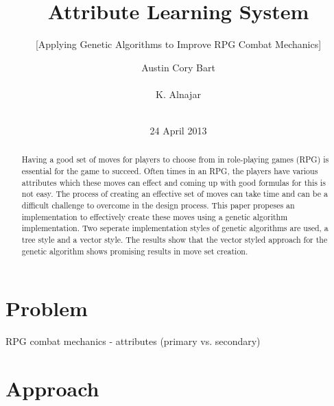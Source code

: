 \documentclass{acm_proc_article-sp}
\begin{document}
\title{Attribute Learning System}
\subtitle{[Applying Genetic Algorithms to Improve RPG Combat Mechanics]} %



\author{
\alignauthor
Austin Cory Bart\\
       \\
\alignauthor
K. Alnajar\\
       \\
\alignauthor
}

\date{24 April 2013}

\maketitle
\begin{abstract}
Having a good set of moves for players to choose from in role-playing games (RPG) is essential for the game to succeed.  Often times in an RPG, the players have various attributes which these moves can effect and coming up with good formulas for this is not easy. The process of creating an effective set of moves can take time and can be a difficult challenge to overcome in the design process. This paper propeses an implementation to effectively create these moves using a genetic algorithm implementation. Two seperate implementation styles of genetic algorithms are used, a tree style and a vector style. The results show that the vector styled approach for the genetic algorithm shows promising results in move set creation.
\end{abstract}




\section{Problem}
    
    RPG combat mechanics - attributes (primary vs. secondary)
	
\section{Approach}
\end{document}
